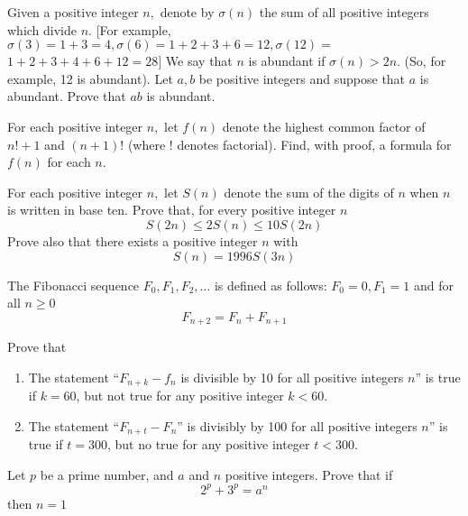 \documentclass{pset}
\begin{document}
\begin{problems}
\begin{problem}[IrMO 1997 Q6]
    Given a positive integer \(n,\) denote by \(\sigma(n)\) the sum of all positive integers which divide \(n .\) [For example, \(\sigma(3)=1+3=4, \sigma(6)=1+2+3+6=12, \sigma(12)=\)
    \(1+2+3+4+6+12=28]\)
    We say that \(n\) is abundant if \(\sigma(n)>2 n .\) (So, for example, 12 is abundant). Let \(a, b\) be positive integers and suppose that \(a\) is abundant. Prove that \(a b\) is abundant.
\end{problem}

\begin{problem}[IrMO 1996 Q1]
    For each positive integer \(n,\) let \(f(n)\) denote the highest common factor of \(n !+1\) and \((n+1) !\) (where ! denotes factorial). Find, with proof, a formula for \(f(n)\) for each \(n .\)
\end{problem}

\begin{problem}[IrMO 1996 Q2]
    For each positive integer \(n,\) let \(S(n)\) denote the sum of the digits of \(n\) when \(n\) is written in base ten. Prove that, for every positive integer \(n\)
    $$
    S(2 n) \leq 2 S(n) \leq 10 S(2 n)
    $$
    Prove also that there exists a positive integer \(n\) with
    $$
    S(n)=1996 S(3 n)
    $$
\end{problem}

\begin{problem}[IrMO 1996 Q6]
    The Fibonacci sequence \(F_{0}, F_{1}, F_{2}, \ldots\) is defined as follows: \(F_{0}=0, F_{1}=1\) and for all \(n \geq 0\)
    $$
    F_{n+2}=F_{n}+F_{n+1}
    $$

    Prove that
    \begin{enumerate}
        \item The statement ``$F_{n +k} - f_n$ is divisible by 10 for all positive integers $n$'' is true if $k = 60$, but not true for any positive integer $k < 60$.
        \item The statement ``$F_{n + t} - F_n$'' is divisibly by 100 for all positive integers $n$'' is true if $t = 300$, but no true for any positive integer $t < 300$.
    \end{enumerate}
\end{problem}

\begin{problem}[IrMO 1996 Q8]
    Let \(p\) be a prime number, and \(a\) and \(n\) positive integers. Prove that if
    $$
    2^{p}+3^{p}=a^{n}
    $$
    then \(n=1\)
\end{problem}


\end{problems}
\end{document}
